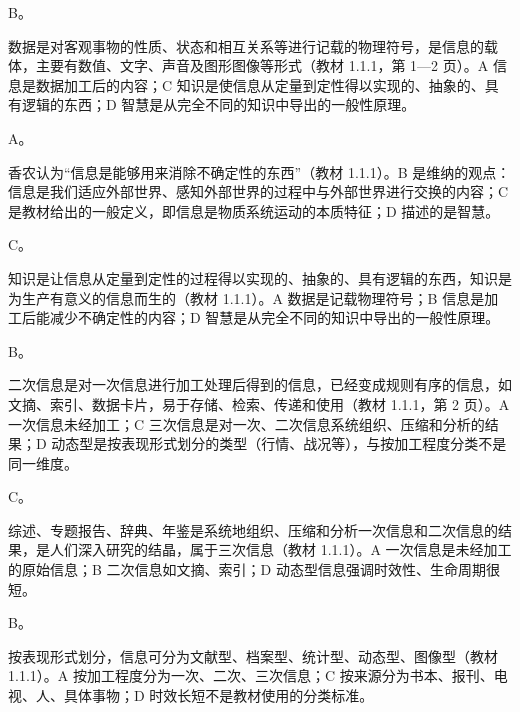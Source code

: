 \documentclass[a4paper,11pt]{article}
\begin{document}


\q B。\begin{analysis}数据是对客观事物的性质、状态和相互关系等进行记载的物理符号，是信息的载体，主要有数值、文字、声音及图形图像等形式（教材 1.1.1，第 1—2 页）。A 信息是数据加工后的内容；C 知识是使信息从定量到定性得以实现的、抽象的、具有逻辑的东西；D 智慧是从完全不同的知识中导出的一般性原理。\end{analysis}

\q A。\begin{analysis}香农认为“信息是能够用来消除不确定性的东西”（教材 1.1.1）。B 是维纳的观点：信息是我们适应外部世界、感知外部世界的过程中与外部世界进行交换的内容；C 是教材给出的一般定义，即信息是物质系统运动的本质特征；D 描述的是智慧。\end{analysis}

\q C。\begin{analysis}知识是让信息从定量到定性的过程得以实现的、抽象的、具有逻辑的东西，知识是为生产有意义的信息而生的（教材 1.1.1）。A 数据是记载物理符号；B 信息是加工后能减少不确定性的内容；D 智慧是从完全不同的知识中导出的一般性原理。\end{analysis}

\q B。\begin{analysis}二次信息是对一次信息进行加工处理后得到的信息，已经变成规则有序的信息，如文摘、索引、数据卡片，易于存储、检索、传递和使用（教材 1.1.1，第 2 页）。A 一次信息未经加工；C 三次信息是对一次、二次信息系统组织、压缩和分析的结果；D 动态型是按表现形式划分的类型（行情、战况等），与按加工程度分类不是同一维度。\end{analysis}

\q C。\begin{analysis}综述、专题报告、辞典、年鉴是系统地组织、压缩和分析一次信息和二次信息的结果，是人们深入研究的结晶，属于三次信息（教材 1.1.1）。A 一次信息是未经加工的原始信息；B 二次信息如文摘、索引；D 动态型信息强调时效性、生命周期很短。\end{analysis}

\q B。\begin{analysis}按表现形式划分，信息可分为文献型、档案型、统计型、动态型、图像型（教材 1.1.1）。A 按加工程度分为一次、二次、三次信息；C 按来源分为书本、报刊、电视、人、具体事物；D 时效长短不是教材使用的分类标准。\end{analysis}
\end{document}
